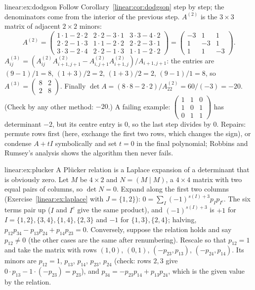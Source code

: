 \begin{solution}{linear:ex:dodgson}
\idea Follow Corollary~\ref{linear:cor:dodgson} step by step; the denominators come from the interior of the previous step.
\writeup $A^{(2)}$ is the $3\times3$ matrix of adjacent $2\times2$ minors:
\[
A^{(2)}=\begin{pmatrix}1\cdot1-2\cdot2&2\cdot2-3\cdot1&3\cdot3-4\cdot2\\2\cdot2-1\cdot3&1\cdot1-2\cdot2&2\cdot2-3\cdot1\\3\cdot3-2\cdot4&2\cdot2-1\cdot3&1\cdot1-2\cdot2\end{pmatrix}=\begin{pmatrix}-3&1&1\\1&-3&1\\1&1&-3\end{pmatrix}.
\]
$A^{(3)}_{ij}=(A^{(2)}_{ij}A^{(2)}_{i+1,j+1}-A^{(2)}_{i,j+1}A^{(2)}_{i+1,j})/A_{i+1,j+1}$: the entries are
$(9-1)/1=8$, $(1+3)/2=2$, $(1+3)/2=2$, $(9-1)/1=8$, so $A^{(3)}=\begin{pmatrix}8&2\\2&8\end{pmatrix}$. Finally
$\det A=(8\cdot8-2\cdot2)/A^{(2)}_{22}=60/(-3)=-20$. (Check by any other method: $-20$.) A failing example:
$\begin{pmatrix}1&1&0\\1&0&1\\0&1&1\end{pmatrix}$ has determinant $-2$, but its centre entry is $0$, so the last step divides by
$0$. Repairs: permute rows first (here, exchange the first two rows, which changes the sign), or condense $A+tI$
symbolically and set $t=0$ in the final polynomial; Robbins and Rumsey's analysis shows the algorithm then never fails.
\end{solution}

\begin{solution}{linear:ex:plucker}
\idea A Pl\"ucker relation is a Laplace expansion of a determinant that is obviously zero.
\writeup Let $M$ be $4\times2$ and $N=(M\mid M)$, a $4\times4$ matrix with two equal pairs of columns, so $\det N=0$. Expand
along the first two columns (Exercise~\ref{linear:ex:laplace} with $J=\{1,2\}$): $0=\sum_I(-1)^{s(I)+3}p_Ip_{I^c}$. The six terms
pair up ($I$ and $I^c$ give the same product), and $(-1)^{s(I)+3}$ is $+1$ for $I=\{1,2\},\{3,4\},\{1,4\},\{2,3\}$ and
$-1$ for $\{1,3\},\{2,4\}$; halving, $p_{12}p_{34}-p_{13}p_{24}+p_{14}p_{23}=0$. Conversely, suppose the relation holds and
say $p_{12}\ne0$ (the other cases are the same after renumbering). Rescale so that $p_{12}=1$ and take the matrix with rows
$(1,0)$, $(0,1)$, $(-p_{23},p_{13})$, $(-p_{24},p_{14})$. Its minors are $p_{12}=1$, $p_{13}$, $p_{14}$, $p_{23}$, $p_{24}$ (check:
rows $2,3$ give $0\cdot p_{13}-1\cdot(-p_{23})=p_{23}$), and $p_{34}=-p_{23}p_{14}+p_{13}p_{24}$, which is the given value by the
relation.
\end{solution}


